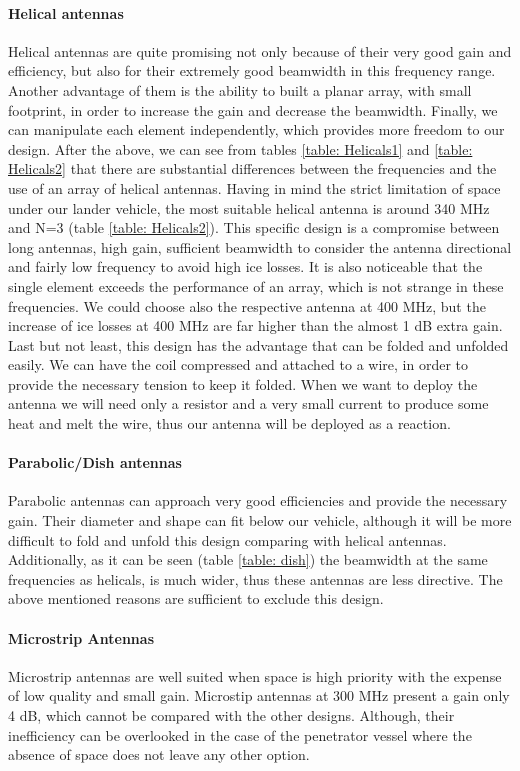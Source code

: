 \paragraph{Helical antennas}
Helical antennas are quite promising not only because of their very good gain and efficiency, but also for their extremely good beamwidth in this frequency range. Another advantage of them is the ability to built a planar array, with small footprint, in order to increase the gain and decrease the beamwidth. Finally, we can manipulate each element independently, which provides more freedom to our design. After the above, we can see from  tables \ref{table: Helicals1} and \ref{table: Helicals2} that there are substantial differences between the frequencies and the use of an array of helical antennas. Having in mind the strict limitation of space under our lander vehicle, the most suitable helical antenna is around 340 MHz and N=3 (table \ref{table: Helicals2}). This specific design is a compromise between long antennas, high gain, sufficient beamwidth to consider the antenna directional and fairly low frequency to avoid high ice losses. It is also noticeable that the single element exceeds the performance of an array, which is not strange in these frequencies. We could choose also the respective antenna at 400 MHz, but the increase of ice losses at 400 MHz are far higher than the almost 1 dB extra gain. Last but not least, this design has the advantage that can be folded and unfolded easily. We can have the coil compressed and attached to a wire, in order to provide the necessary tension to keep it folded. When we want to deploy the antenna we will need only a resistor and a very small current to produce some heat and melt the wire, thus our antenna will be deployed as a reaction.
\paragraph{Parabolic/Dish antennas}
Parabolic antennas can approach very good efficiencies and provide the necessary gain. Their diameter and shape can fit below our vehicle, although it will be more difficult to fold and unfold this design comparing with helical antennas. Additionally, as it can be seen (table \ref{table: dish}) the beamwidth at the same frequencies as helicals, is much wider, thus these antennas are less directive. The above mentioned reasons are sufficient to exclude this design. 
\paragraph{Microstrip Antennas}
Microstrip antennas are well suited when space is high priority with the expense of low quality and small gain. Microstip antennas at 300 MHz present a gain only 4 dB, which cannot be compared with the other designs. Although, their inefficiency can be overlooked in the case of the penetrator vessel where the absence of space does not leave any other option.

